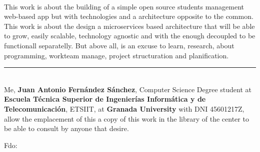\chapter*{}


\cleardoublepage
\thispagestyle{empty}

\begin{center}
{\large\bfseries \myTitle}\\
\end{center}
\begin{center}
\myName\\
\end{center}

\\

\vspace{0.7cm}
\\

This work is about the building of a simple  open source students management
web-based app but with technologies and a architecture opposite to the common.
This work is about the design a microservices based architecture that will be
able to grow, easily scalable, technology agnostic and with the enough decoupled
to be functionall separatelly. But above all, is an excuse to learn, research,
about programming, workteam manage, project structuration and planification.
\cleardoublepage

\thispagestyle{empty}

\noindent\rule[-1ex]{\textwidth}{2pt}\\[4.5ex]


Me, \textbf{Juan Antonio Fernández Sánchez}, Computer Science Degree student at
\textbf{Escuela Técnica Superior de Ingenierías Informática y de Telecomunicación},
ETSIIT, at \textbf{Granada University} with DNI 45601217Z, allow the emplacement of this a copy
of this work in the library of the center to be able to consult by anyone that desire.

\vspace{6cm}

\noindent Fdo: \myName

\vspace{2cm}

\begin{flushright}
\myDate %
\end{flushright}

